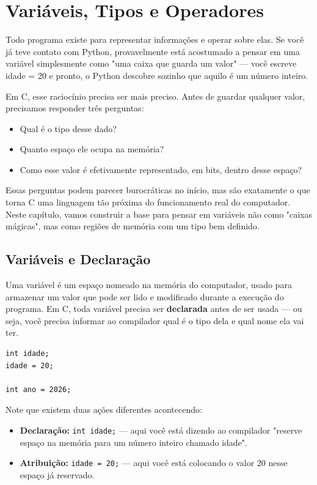 \documentclass[12pt,a4paper,oneside]{extreport}
\begin{document}
    



\chapter{Variáveis, Tipos e Operadores}

Todo programa existe para representar informações e operar sobre elas. Se você já teve contato com Python, provavelmente está acostumado a pensar em uma variável simplesmente como "uma caixa que guarda um valor" — você escreve idade = 20 e pronto, o Python descobre sozinho que aquilo é um número inteiro.

Em C, esse raciocínio precisa ser mais preciso. Antes de guardar qualquer valor, precisamos responder três perguntas:

\begin{itemize}
    \item Qual é o tipo desse dado?
    \item Quanto espaço ele ocupa na memória?
    \item Como esse valor é efetivamente representado, em bits, dentro desse espaço?
\end{itemize}

Essas perguntas podem parecer burocráticas no início, mas são exatamente o que torna C uma linguagem tão próxima do funcionamento real do computador. Neste capítulo, vamos construir a base para pensar em variáveis não como "caixas mágicas", mas como regiões de memória com um tipo bem definido.

\section{Variáveis e Declaração}

Uma variável é um espaço nomeado na memória do computador, usado para armazenar um valor que pode ser lido e modificado durante a execução do programa. Em C, toda variável precisa ser \textbf{declarada} antes de ser usada — ou seja, você precisa informar ao compilador qual é o tipo dela e qual nome ela vai ter.

\begin{lstlisting}
int idade;
idade = 20;

int ano = 2026;
\end{lstlisting}

Note que existem duas ações diferentes acontecendo:

\begin{itemize}

    \item \textbf{Declaração:} \texttt{int idade;} — aqui você está dizendo ao compilador "reserve espaço na memória para um número inteiro chamado idade".
    \item \textbf{Atribuição:} \texttt{idade = 20;} — aqui você está colocando o valor 20 nesse espaço já reservado.

\end{itemize}
\end{document}
